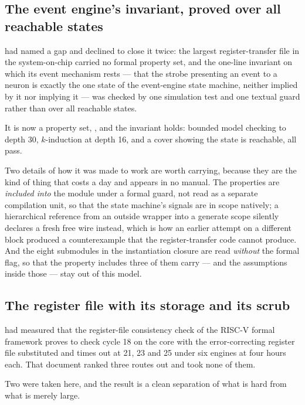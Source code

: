 \subsection{The event engine's invariant, proved over all reachable
states}

 had named a gap and declined to close it twice:
the largest register-transfer file in the system-on-chip carried no
formal property set, and the one-line invariant on which its event
mechanism rests --- that the strobe presenting an event to a neuron is
exactly the one state of the event-engine state machine, neither
implied by it nor implying it --- was checked by one simulation test
and one textual guard rather than over all reachable states.

It is now a property set, , and the
invariant holds: bounded model checking to depth 30, $k$-induction at
depth 16, and a cover showing the state is reachable, all pass.

Two details of how it was made to work are worth carrying, because they
are the kind of thing that costs a day and appears in no manual. The
properties are \emph{included into} the module under a formal guard, not
read as a separate compilation unit, so that the state machine's
signals are in scope natively; a hierarchical reference from an outside
wrapper into a generate scope silently declares a fresh free wire
instead, which is how an earlier attempt on a different block produced a
counterexample that the register-transfer code cannot produce. And the
eight submodules in the instantiation closure are read \emph{without}
the formal flag, so that the property includes three of them carry ---
and the assumptions inside those --- stay out of this model.

\subsection{The register file with its storage and its scrub}

 had measured that the register-file consistency
check of the RISC-V formal framework proves to check cycle 18 on the
core with the error-correcting register file substituted and times out
at 21, 23 and 25 under six engines at four hours each. That document
ranked three routes out and took none of them.

Two were taken here, and the result is a clean separation of what is
hard from what is merely large.

